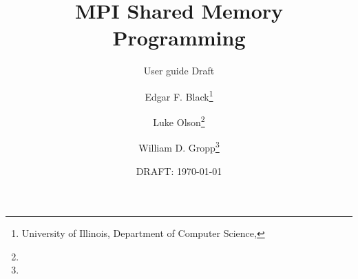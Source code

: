 \documentclass[pagesize=auto, fontsize=11pt, DIV=11]{scrartcl}
\title{MPI Shared Memory Programming}
\subtitle{User guide Draft}
\author{%
  Edgar F. Black\thanks{University of Illinois, Department of Computer Science, \mail{efblack2@illinois.edu}}%
  \and Luke Olson\thanks{\mail{lukeo@illinois.edu}}%
  \and William D. Gropp\thanks{\mail{wgropp@illinois.edu}}%
}
\date{DRAFT: \today} %
\begin{document}
\maketitle

\noindent


\begin{comment}

\begin{quote}
  \footnotesize
  The guide will present methods and best practices for efficient use of shared memory in two different contexts: \textbf{hybrid programing} and \textbf{share memory programing}.
\end{quote}
\end{comment}


%





\end{document}
